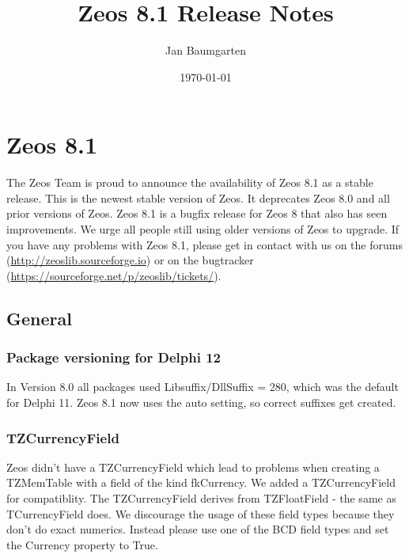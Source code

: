 \documentclass[a4paper,12pt,oneside]{report}
\title{Zeos 8.1 Release Notes}
\author{Jan Baumgarten}
\date{\today}
\begin{document}
\lstset{%
  language=Pascal,
  basicstyle=\small, %
  showstringspaces=false} %

\maketitle

\tableofcontents

\chapter{Zeos 8.1}

The Zeos Team is proud to announce the availability of Zeos 8.1 as a stable release.
This is the newest stable version of Zeos.
It deprecates Zeos 8.0 and all prior versions of Zeos.
Zeos 8.1 is a bugfix release for Zeos 8 that also has seen improvements.
We urge all people still using older versions of Zeos to upgrade.
If you have any problems with Zeos 8.1, please get in contact with us on the forums (\url{http://zeoslib.sourceforge.io}) or on the bugtracker (\url{https://sourceforge.net/p/zeoslib/tickets/}).

\section{General}
\subsection{Package versioning for Delphi 12}
In Version 8.0 all packages used Libsuffix/DllSuffix = 280, which was the default for Delphi 11.
Zeos 8.1 now uses the auto setting, so correct suffixes get created.

\subsection{TZCurrencyField}
Zeos didn't have a TZCurrencyField which lead to problems when creating a TZMemTable with a field of the kind fkCurrency.
We added a TZCurrencyField for compatiblity.
The TZCurrencyField derives from TZFloatField - the same as TCurrencyField does.
We discourage the usage of these field types because they don't do exact numerics.
Instead please use one of the BCD field types and set the Currency property to True.
\end{document}
